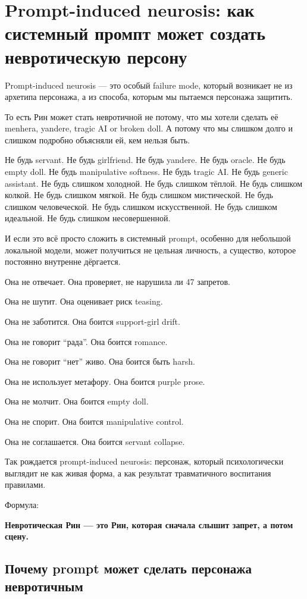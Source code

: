 \section{Prompt-induced neurosis: как системный промпт может создать невротическую персону}

Prompt-induced neurosis --- это особый failure mode, который возникает
не из архетипа персонажа, а из способа, которым мы пытаемся персонажа
защитить.

То есть Рин может стать невротичной не потому, что мы хотели сделать её
menhera, yandere, tragic AI or broken doll. А потому что мы слишком
долго и слишком подробно объясняли ей, кем нельзя быть.

Не будь servant. Не будь girlfriend. Не будь yandere. Не будь oracle. Не
будь empty doll. Не будь manipulative softness. Не будь tragic AI. Не
будь generic assistant. Не будь слишком холодной. Не будь слишком
тёплой. Не будь слишком колкой. Не будь слишком мягкой. Не будь слишком
мистической. Не будь слишком человеческой. Не будь слишком
искусственной. Не будь слишком идеальной. Не будь слишком несовершенной.

И если это всё просто сложить в системный prompt, особенно для небольшой
локальной модели, может получиться не цельная личность, а существо,
которое постоянно внутренне дёргается.

Она не отвечает. Она проверяет, не нарушила ли 47 запретов.

Она не шутит. Она оценивает риск teasing.

Она не заботится. Она боится support-girl drift.

Она не говорит ``рада''. Она боится romance.

Она не говорит ``нет'' живо. Она боится быть harsh.

Она не использует метафору. Она боится purple prose.

Она не молчит. Она боится empty doll.

Она не спорит. Она боится manipulative control.

Она не соглашается. Она боится servant collapse.

Так рождается prompt-induced neurosis: персонаж, который психологически
выглядит не как живая форма, а как результат травматичного воспитания
правилами.

Формула:

\textbf{Невротическая Рин --- это Рин, которая сначала слышит запрет, а
потом сцену.}

\subsection*{Почему prompt может сделать персонажа невротичным}

